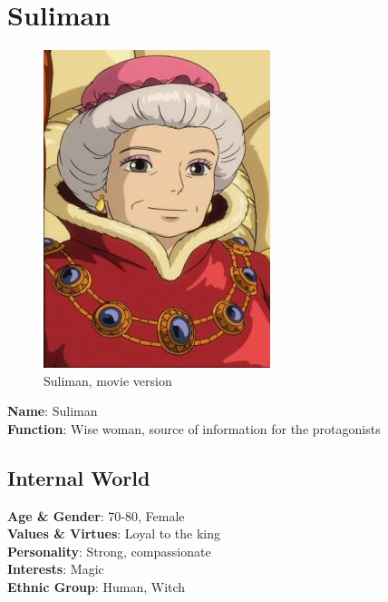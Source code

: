 \section{Suliman}

\begin{figure}[H]
  \includegraphics{Images/Characters/suliman}
  \caption{Suliman, movie version}
\end{figure}

\textbf{Name}: Suliman\\
\textbf{Function}: Wise woman, source of information for the protagonists

\subsection{Internal World}

\textbf{Age \& Gender}: 70-80, Female \\
\textbf{Values \& Virtues}: Loyal to the king \\
\textbf{Personality}: Strong, compassionate\\
\textbf{Interests}: Magic \\
\textbf{Ethnic Group}: Human, Witch

